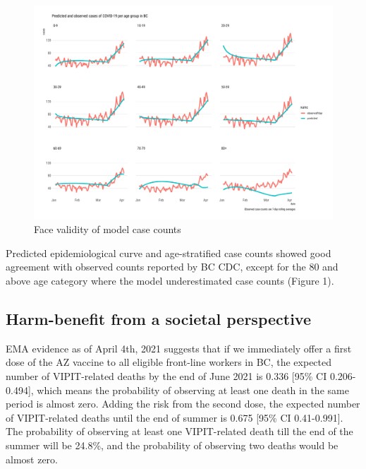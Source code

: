 \documentclass[]{interact}
\theoremstyle{plain}%
\theoremstyle{definition}
\theoremstyle{remark}
\begin{document}
\begin{figure}

{\centering \includegraphics[width=1\linewidth]{../figures/fig-validation} 

}

\caption{Face validity of model case counts}\label{fig:figValidation}
\end{figure}

Predicted epidemiological curve and age-stratified case counts showed
good agreement with observed counts reported by BC CDC, except for the
80 and above age category where the model underestimated case counts
(Figure 1).

\hypertarget{harm-benefit-from-a-societal-perspective}{%
\subsection{Harm-benefit from a societal
perspective}\label{harm-benefit-from-a-societal-perspective}}

EMA evidence as of April 4th, 2021 suggests that if we immediately offer
a first dose of the AZ vaccine to all eligible front-line workers in BC,
the expected number of VIPIT-related deaths by the end of June 2021 is
0.336 {[}95\% CI 0.206-0.494{]}, which means the probability of
observing at least one death in the same period is almost zero. Adding
the risk from the second dose, the expected number of VIPIT-related
deaths until the end of summer is 0.675 {[}95\% CI 0.41-0.991{]}. The
probability of observing at least one VIPIT-related death till the end
of the summer will be 24.8\%, and the probability of observing two
deaths would be almost zero.
\end{document}
